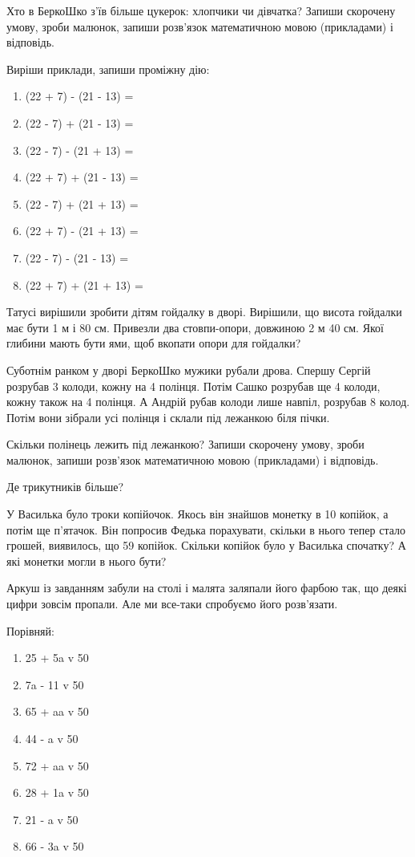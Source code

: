Хто в БеркоШко з’їв більше цукерок: хлопчики чи дівчатка?
Запиши скорочену умову, зроби малюнок, запиши розв’язок
математичною мовою (прикладами) і відповідь.


\problem
Виріши приклади, запиши проміжну дію:
\begin{multicols}{2}
    \begin{enumerate}
        \item (22 + 7) - (21 - 13) = 
        \item (22 - 7) + (21 - 13) = 
        \item (22 - 7) - (21 + 13) = 
        \item (22 + 7) + (21 - 13) = 
        \item (22 - 7) + (21 + 13) = 
        \item (22 + 7) - (21 + 13) = 
        \item (22 - 7) - (21 - 13) = 
        \item (22 + 7) + (21 + 13) = 
    \end{enumerate}
\end{multicols}


\problem
Татусі вирішили зробити дітям гойдалку в дворі.
Вирішили, що висота гойдалки має бути 1 м і 80 см.
Привезли два стовпи-опори, довжиною 2 м 40 см.
Якої глибини мають бути ями, щоб вкопати опори для гойдалки?


\problem
Суботнім ранком у дворі БеркоШко мужики рубали дрова.
Спершу Сергій розрубав 3 колоди, кожну на 4 полінця.
Потім Сашко розрубав ще 4 колоди, кожну також на 4 полінця.
А Андрій рубав колоди лише навпіл, розрубав 8 колод.
Потім вони зібрали усі полінця і склали під лежанкою біля пічки.

Скільки полінець лежить під лежанкою?
Запиши скорочену умову, зроби малюнок,
запиши розв’язок математичною мовою (прикладами) і відповідь.


\problem
Де трикутників більше?


\problem
У Василька було троки копійочок.
Якось він знайшов монетку в 10 копійок, а потім ще п’ятачок.
Він попросив Федька порахувати, скільки в нього тепер стало грошей,
виявилось, що 59 копійок.
Скільки копійок було у Василька спочатку?
А які монетки могли в нього бути? 


\problem
Аркуш із завданням забули на столі і малята заляпали його фарбою так,
що деякі цифри зовсім пропали.
Але ми все-таки спробуємо його розв’язати.

Порівняй:
\begin{multicols}{2}
    \begin{enumerate}
        \item 25 + 5a v 50
        \item 7a - 11 v 50
        \item 65 + aa v 50
        \item 44 - a v 50
        \item 72 + aa v 50
        \item 28 + 1a v 50
        \item 21 - a v 50
        \item 66 - 3a v 50
    \end{enumerate}
\end{multicols}


